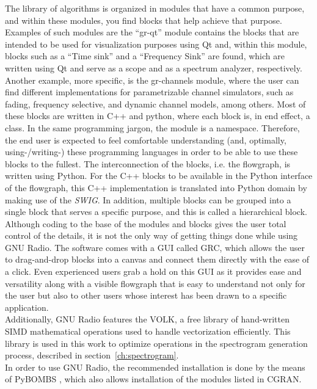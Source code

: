 The library of algorithms is organized in modules that have a common purpose, and within these modules, you find blocks that help achieve that purpose. Examples of such modules are the “gr-qt” module contains the blocks that are intended to be used for visualization purposes using Qt \cite{Qt} and, within this module, blocks such as a “Time sink” and a “Frequency Sink” are found, which are written using Qt and serve as a scope and as a spectrum analyzer, respectively. Another example, more specific, is the gr-channels module, where the user can find different implementations for parametrizable channel simulators, such as fading, frequency selective, and dynamic channel models, among others. Most of these blocks are written in C++ and python, where each block is, in end effect, a class. In the same programming jargon, the module is a namespace. Therefore, the end user is expected to feel comfortable understanding (and, optimally, using-/writing-) these programming languages in order to be able to use these blocks to the fullest. The interconnection of the blocks, i.e. the flowgraph, is written using Python. For the C++ blocks to be available in the Python interface of the flowgraph, this C++ implementation is translated into Python domain by making use of the \emph{\ac{SWIG}}. In addition, multiple blocks can be grouped into a single block that serves a specific purpose, and this is called a hierarchical block.\\

Although coding to the base of the modules and blocks gives the user total control of the details, it is not the only way of getting things done while using GNU Radio. The software comes with a \ac{GUI} called \ac{GRC}, which allows the user to drag-and-drop blocks into a canvas and connect them directly with the ease of a click. Even experienced users grab a hold on this \ac{GUI} as it provides ease and versatility along with a visible flowgraph that is easy to understand not only for the user but also to other users whose interest has been drawn to a specific application.\\

Additionally, GNU Radio features the \ac{VOLK}\cite{VOLK}, a free library of hand-written SIMD mathematical operations used to handle vectorization efficiently. This library is used in this work to optimize operations in the spectrogram generation process, described in section~\ref{ch:spectrogram}.\\

In order to use GNU Radio, the recommended installation is done by the means of \ac{PyBOMBS} \cite{PyBOMBS}, which also allows installation of the modules listed in \ac{CGRAN}.

